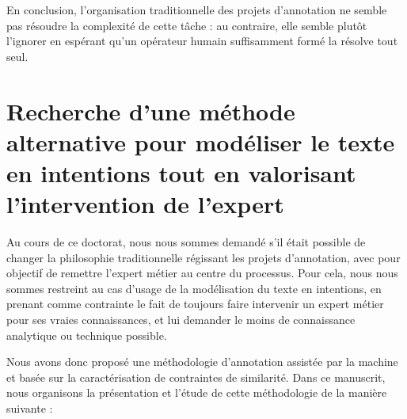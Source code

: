 		En conclusion, l'organisation traditionnelle des projets d'annotation ne semble pas résoudre la complexité de cette tâche : au contraire, elle semble plutôt l'ignorer en espérant qu'un opérateur humain suffisamment formé la résolve tout seul.
		
		
	\newpage
	\section*{Recherche d'une méthode alternative pour modéliser le texte en intentions tout en valorisant l'intervention de l'expert}
		
		Au cours de ce doctorat, nous nous sommes demandé s'il était possible de changer la philosophie traditionnelle régissant les projets d'annotation, avec pour objectif de remettre l'expert métier au centre du processus.
		Pour cela, nous nous sommes restreint au cas d'usage de la modélisation du texte en intentions, en prenant comme contrainte le fait de toujours faire intervenir un expert métier pour ses vraies connaissances, et lui demander le moins de connaissance analytique ou technique possible.
		
		Nous avons donc proposé une méthodologie d'annotation assistée par la machine et basée sur la caractérisation de contraintes de similarité.
		Dans ce manuscrit, nous organisons la présentation et l'étude de cette méthodologie de la manière suivante :
		
